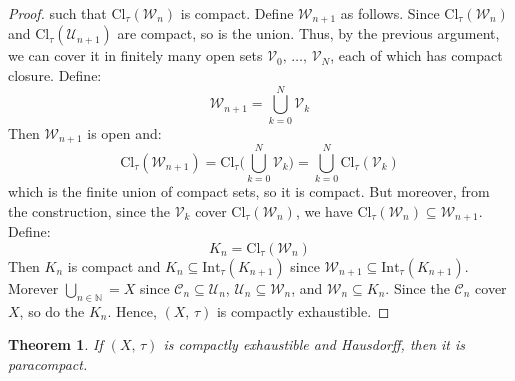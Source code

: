 \documentclass{article}
\theoremstyle{plain}
\newtheorem{theorem}{Theorem}[section]
\theoremstyle{normal}
\begin{document}
\begin{proof}
            such that $\textrm{Cl}_{\tau}(\mathcal{W}_{n})$ is compact.
            Define $\mathcal{W}_{n+1}$ as follows. Since
            $\textrm{Cl}_{\tau}(\mathcal{W}_{n})$ and
            $\textrm{Cl}_{\tau}(\mathcal{U}_{n+1})$ are compact, so is the
            union. Thus, by the previous argument, we can cover it in finitely
            many open sets $\mathcal{V}_{0},\,\dots,\,\mathcal{V}_{N}$, each
            of which has compact closure. Define:
            \begin{equation}
                \mathcal{W}_{n+1}=\bigcup_{k=0}^{N}\mathcal{V}_{k}
            \end{equation}
            Then $\mathcal{W}_{n+1}$ is open and:
            \begin{equation}
                \textrm{Cl}_{\tau}(\mathcal{W}_{n+1})
                =\textrm{Cl}_{\tau}\Big(\bigcup_{k=0}^{N}\mathcal{V}_{k}\Big)
                =\bigcup_{k=0}^{N}\textrm{Cl}_{\tau}(\mathcal{V}_{k})
            \end{equation}
            which is the finite union of compact sets, so it is compact.
            But moreover, from the construction, since the $\mathcal{V}_{k}$
            cover $\textrm{Cl}_{\tau}(\mathcal{W}_{n})$, we have
            $\textrm{Cl}_{\tau}(\mathcal{W}_{n})\subseteq\mathcal{W}_{n+1}$.
            Define:
            \begin{equation}
                K_{n}=\textrm{Cl}_{\tau}(\mathcal{W}_{n})
            \end{equation}
            Then $K_{n}$ is compact and
            $K_{n}\subseteq\textrm{Int}_{\tau}(K_{n+1})$ since
            $\mathcal{W}_{n+1}\subseteq\textrm{Int}_{\tau}(K_{n+1})$. Morever
            $\bigcup_{n\in\mathbb{N}}=X$ since
            $\mathcal{C}_{n}\subseteq\mathcal{U}_{n}$,
            $\mathcal{U}_{n}\subseteq\mathcal{W}_{n}$, and
            $\mathcal{W}_{n}\subseteq{K}_{n}$. Since the $\mathcal{C}_{n}$
            cover $X$, so do the $K_{n}$. Hence, $(X,\,\tau)$ is
            compactly exhaustible.
        \end{proof}
        \begin{theorem}
            If $(X,\,\tau)$ is compactly exhaustible and Hausdorff,
            then it is paracompact.
        \end{theorem}
\end{document}
